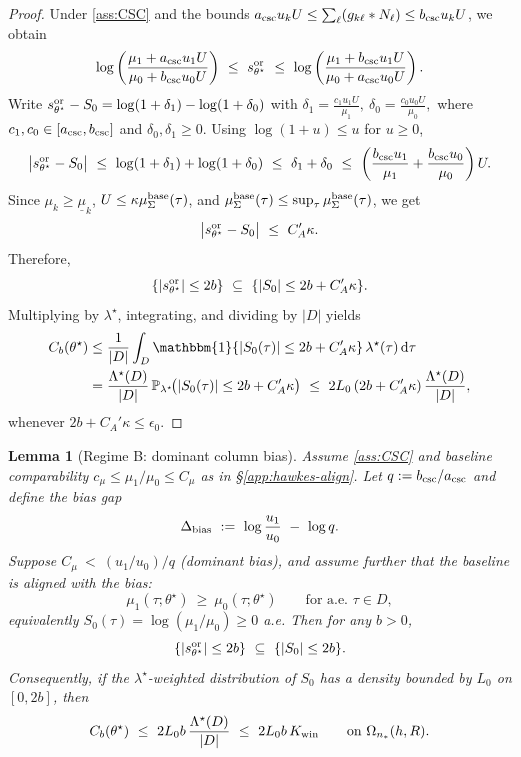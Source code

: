 \documentclass{statsoc}
\newtheorem{lemma}[lemma]{Lemma}
\newcommand{\dd}{\mathrm{d}}
\newcommand{\1}{\mathbbm{1}}
\begin{document}
\begin{proof}
Under \cref{ass:CSC} and the bounds $a_{\rm csc}u_k U\le \sum_\ell (g_{k\ell}*N_\ell)\le b_{\rm csc}u_k U$, we obtain
\[
\log\left(\frac{\mu_1+a_{\rm csc}u_1 U}{\mu_0+b_{\rm csc}u_0 U}\right)\ \le\ s^{\rm or}_{\theta^\star}\ \le\ \log\left(\frac{\mu_1+b_{\rm csc}u_1 U}{\mu_0+a_{\rm csc}u_0 U}\right).
\]
Write $s^{\rm or}_{\theta^\star}-S_0=\log(1+\delta_1)-\log(1+\delta_0)$ with
\(
\delta_1=\frac{c_1u_1U}{\mu_1},\ \delta_0=\frac{c_0u_0U}{\mu_0},
\)
where $c_1,c_0\in[a_{\rm csc},b_{\rm csc}]$ and $\delta_0,\delta_1\ge0$. Using $\log(1+u)\le u$ for $u\ge0$,
\[
\big|s^{\rm or}_{\theta^\star}-S_0\big|
\ \le\ \log(1+\delta_1)+\log(1+\delta_0)
\ \le\ \delta_1+\delta_0
\ \le\ \left(\frac{b_{\rm csc}u_1}{\mu_1}+\frac{b_{\rm csc}u_0}{\mu_0}\right)U.
\]
Since $\mu_k\ge \underline\mu_k$, $U\le \kappa \mu_\Sigma^{\rm base}(\tau)$, and $\mu_\Sigma^{\rm base}(\tau)\le \sup_\tau \mu_\Sigma^{\rm base}(\tau)$, we get
\[
\big|s^{\rm or}_{\theta^\star}-S_0\big|\ \le\ C_A' \kappa.
\]
Therefore,
\[
\{ |s^{\rm or}_{\theta^\star}|\le 2b \}\ \subseteq\ \{ |S_0|\le 2b+C_A'\kappa \}.
\]
Multiplying by $\lambda^\star$, integrating, and dividing by $|D|$ yields
\begin{align*}
C_b(\theta^\star)
&\le \frac{1}{|D|}\int_D \1\{|S_0(\tau)|\le 2b+C_A'\kappa\}\,\lambda^\star(\tau)\,\dd\tau \\
&= \frac{\Lambda^\star(D)}{|D|}\,
\mathbb P_{\lambda^\star}\!\big(|S_0(\tau)|\le 2b+C_A'\kappa\big)
\ \le\ 2L_0\,(2b+C_A'\kappa)\,\frac{\Lambda^\star(D)}{|D|},
\end{align*}
whenever $2b+C_A'\kappa\le \epsilon_0$.
\end{proof}

\begin{lemma}[Regime B: dominant column bias]\label{lem:regB}
Assume \cref{ass:CSC} and baseline comparability $c_\mu\le \mu_1/\mu_0\le C_\mu$ as in \S\ref{app:hawkes-align}. Let $q:=b_{\rm csc}/a_{\rm csc}$ and define the bias gap
\[
\Delta_{\rm bias}\ :=\ \log\frac{u_1}{u_0}\ -\ \log q.
\]
Suppose $C_\mu\ <\ (u_1/u_0)/q$ (dominant bias), and assume further that the baseline is aligned with the bias:
\[
\mu_1(\tau;\theta^\star)\ \ge\ \mu_0(\tau;\theta^\star)\qquad\text{for a.e.\ }\tau\in D,
\]
equivalently $S_0(\tau)=\log(\mu_1/\mu_0)\ge 0$ a.e. Then for any $b>0$,
\[
\{ |s^{\rm or}_{\theta^\star}|\le 2b \}\ \subseteq\ \{ |S_0|\le 2b \}.
\]
Consequently, if the $\lambda^\star$-weighted distribution of $S_0$ has a density bounded by $L_0$ on $[0,2b]$, then
\[
C_b(\theta^\star)
\ \le\ 2L_0 b\,\frac{\Lambda^\star(D)}{|D|}
\ \le\ 2L_0 b\,K_{\rm win}\qquad\text{on }\Omega_{n_*}(h,R).
\]
\end{lemma}
\end{document}
